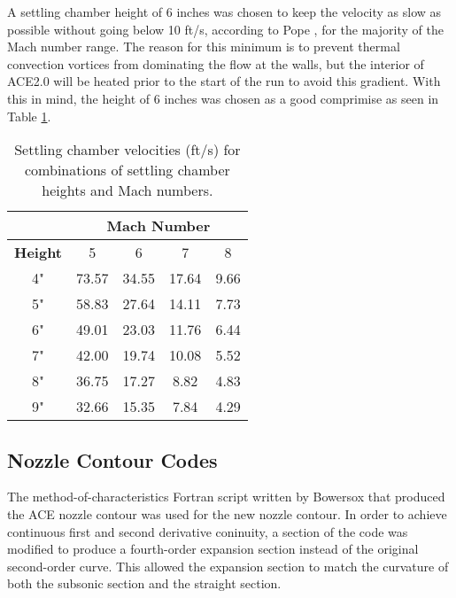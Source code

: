 A settling chamber height of 6 inches was chosen to keep the velocity as slow as possible without going below 10 ft/s, according to Pope \cite{pope}, for the majority of the Mach number range. The reason for this minimum is to prevent thermal convection vortices from dominating the flow at the walls, but the interior of ACE2.0 will be heated prior to the start of the run to avoid this gradient. With this in mind, the height of 6 inches was chosen as a good comprimise as seen in Table \ref{tab:sc_vel}.

\begin{table}[ht!]
    \centering
    \begin{tabular}{|c|c|c|c|c|}
        \cline{2-5}
        \multicolumn{1}{c}{} & \multicolumn{4}{|c|}{\textbf{Mach Number}} \\ \hline
        \textbf{Height} & 5 & 6 & 7 & 8 \\ \hline
        4" & 73.57 & 34.55 & 17.64 & 9.66 \\ \hline
        5" & 58.83 & 27.64 & 14.11 & 7.73 \\ \hline \hline
        6" & 49.01 & 23.03 & 11.76 & 6.44 \\ \hline \hline
        7" & 42.00 & 19.74 & 10.08 & 5.52 \\ \hline
        8" & 36.75 & 17.27 & 8.82 & 4.83 \\ \hline
        9" & 32.66 & 15.35 & 7.84 & 4.29 \\ \hline
    \end{tabular}
    \caption{Settling chamber velocities (ft/s) for combinations of settling chamber heights and Mach numbers.}
    \label{tab:sc_vel}
\end{table}
    
\subsection{Nozzle Contour Codes}

The method-of-characteristics Fortran script written by Bowersox that produced the ACE nozzle contour was used for the new nozzle contour. In order to achieve continuous first and second derivative coninuity, a section of the code was modified to produce a fourth-order expansion section instead of the original second-order curve. This allowed the expansion section to match the curvature of both the subsonic section and the straight section.

